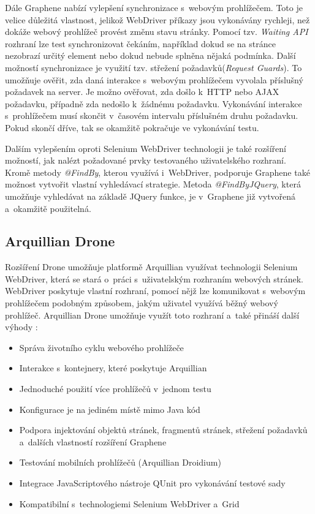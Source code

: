 \documentclass[
    color,   %
	table,   %
    twoside, %
    nolot, nolof,
]{fithesis3}
\begin{document}
Dále Graphene nabízí vylepšení synchronizace s~webovým prohlížečem. Toto je velice důležitá vlastnost, jelikož WebDriver příkazy jsou vykonávány rychleji, než dokáže webový prohlížeč provést změnu stavu stránky. Pomocí tzv. \emph{Waiting API} rozhraní \cite{Graphene} lze test synchronizovat čekáním, například dokud se na stránce nezobrazí určitý element nebo dokud nebude splněna nějaká podmínka. Další možností synchronizace je využití tzv. střežení požadavků(\emph{Request Guards}). To umožňuje ověřit, zda daná interakce s~webovým prohlížečem vyvolala příslušný požadavek na server. Je možno ověřovat, zda došlo k~HTTP nebo AJAX požadavku, případně zda nedošlo k~žádnému požadavku. Vykonávání interakce s~prohlížečem musí skončit v~časovém intervalu příslušném druhu požadavku. Pokud skončí dříve, tak se okamžitě pokračuje ve vykonávání testu.

Dalším vylepšením oproti Selenium WebDriver technologii je také rozšíření možností, jak nalézt požadované prvky testovaného uživatelského rozhraní. Kromě metody \emph{@FindBy}, kterou využívá i~WebDriver, podporuje Graphene také možnost vytvořit vlastní vyhledávací strategie. Metoda \emph{@FindByJQuery}, která umožňuje vyhledávat na základě JQuery funkce, je v~Graphene již vytvořená a~okamžitě použitelná.

\subsection{Arquillian Drone}
\label{subsec:3.2.2}

Rozšíření Drone umožňuje platformě Arquillian využívat technologii Selenium WebDriver, která se stará o~práci s~uživatelským rozhraním webových stránek. WebDriver poskytuje vlastní rozhraní, pomocí nějž lze komunikovat s~webovým prohlížečem podobným způsobem, jakým uživatel využívá běžný webový prohlížeč. Arquillian Drone umožňuje využít toto rozhraní a~také přináší další výhody \cite{Drone}:
\begin{itemize}
\item Správa životního cyklu webového prohlížeče
\item Interakce s~kontejnery, které poskytuje Arquillian
\item Jednoduché použití více prohlížečů v~jednom testu
\item Konfigurace je na jediném místě mimo Java kód
\item Podpora injektování objektů stránek, fragmentů stránek, střežení požadavků a~dalších vlastností rozšíření Graphene
\item Testování mobilních prohlížečů (Arquillian Droidium)
\item Integrace JavaScriptového nástroje QUnit pro vykonávání testové sady
\item Kompatibilní s~technologiemi Selenium WebDriver a~Grid
\end{itemize}
\end{document}
